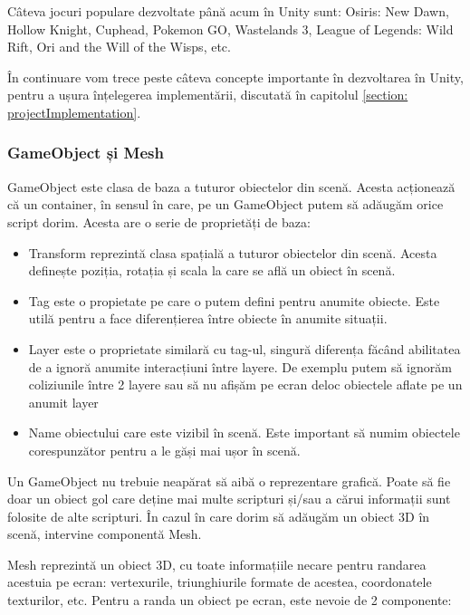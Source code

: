 \documentclass[12pt, a4paper]{article}
\begin{document}
	Câteva jocuri populare dezvoltate până acum în Unity sunt: Osiris: New Dawn, Hollow Knight, Cuphead, Pokemon GO, Wastelands 3, League of Legends: Wild Rift, Ori and the Will of the Wisps, etc.
	\newline
	
	În continuare vom trece peste câteva concepte importante în dezvoltarea în Unity, pentru a ușura înțelegerea implementării, discutată în capitolul \ref{section: projectImplementation}.
	
	
	
	
	\subsubsection{GameObject și Mesh}
	
	GameObject este clasa de baza a tuturor obiectelor din scenă. Acesta acționează că un container, în sensul în care, pe un GameObject putem să adăugăm orice script dorim. Acesta are o serie de proprietăți de baza:
	
	\begin{itemize}
		\item Transform reprezintă clasa spațială a tuturor obiectelor din scenă. Acesta definește poziția, rotația și scala la care se află un obiect în scenă.
		\item Tag este o propietate pe care o putem defini pentru anumite obiecte. Este utilă pentru a face diferențierea între obiecte în anumite situații. 
		\item Layer este o proprietate similară cu tag-ul, singură diferența făcând abilitatea de a ignoră anumite interacțiuni între layere. De exemplu putem să ignorăm coliziunile între 2 layere sau să nu afișăm pe ecran deloc obiectele aflate pe un anumit layer
		\item Name obiectului care este vizibil în scenă. Este important să numim obiectele corespunzător pentru a le găși mai ușor în scenă.
	\end{itemize}
	
	Un GameObject nu trebuie neapărat să aibă o reprezentare grafică. Poate să fie doar un obiect gol care deține mai multe scripturi și/sau a cărui informații sunt folosite de alte scripturi. În cazul în care dorim să adăugăm un obiect 3D în scenă, intervine componentă Mesh.
	\newline
	
	Mesh reprezintă un obiect 3D, cu toate informațiile necare pentru randarea acestuia pe ecran: vertexurile, triunghiurile formate de acestea, coordonatele texturilor, etc. Pentru a randa un obiect pe ecran, este nevoie de 2 componente:
	
\end{document}

